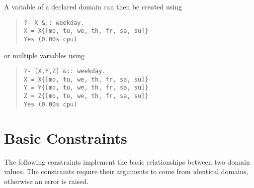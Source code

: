 A variable of a declared domain can then be created using
\begin{quote}\begin{verbatim}
?- X &:: weekday.
X = X{[mo, tu, we, th, fr, sa, su]}
Yes (0.00s cpu)
\end{verbatim}\end{quote}
or multiple variables using
\begin{quote}\begin{verbatim}
?- [X,Y,Z] &:: weekday.
X = X{[mo, tu, we, th, fr, sa, su]}
Y = Y{[mo, tu, we, th, fr, sa, su]}
Z = Z{[mo, tu, we, th, fr, sa, su]}
Yes (0.00s cpu)
\end{verbatim}\end{quote}


\section{Basic Constraints}
The following constraints implement the basic relationships between
two domain values.  The constraints require their arguments to come
from identical domains, otherwise an error is raised.
